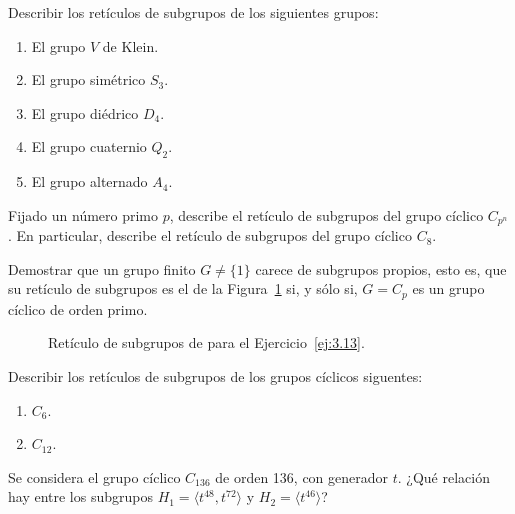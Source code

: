 \begin{ejercicio}\label{ej:3.11}
    Describir los retículos de subgrupos de los siguientes grupos:
    \begin{enumerate}
        \item El grupo $V$ de Klein.
        \item El grupo simétrico $S_3$.
        \item El grupo diédrico $D_4$.
        \item El grupo cuaternio $Q_2$.
        \item El grupo alternado $A_4$.
    \end{enumerate}
\end{ejercicio}

\begin{ejercicio}\label{ej:3.12}
    Fijado un número primo $p$, describe el retículo de subgrupos del grupo cíclico $C_{p^n}$. En particular, describe el retículo de subgrupos del grupo cíclico $C_8$.
\end{ejercicio}

\begin{ejercicio}\label{ej:3.13}
    Demostrar que un grupo finito $G \neq \{1\}$ carece de subgrupos propios, esto es, que su retículo de subgrupos es el de la Figura~\ref{fig:ej13} si, y sólo si, $G = C_p$ es un grupo cíclico de orden primo.
    \begin{figure}
        \centering
        \caption{Retículo de subgrupos de para el Ejercicio~\ref{ej:3.13}.}
        \label{fig:ej13}
    \end{figure}
\end{ejercicio}

\begin{ejercicio}\label{ej:3.14}
    Describir los retículos de subgrupos de los grupos cíclicos siguentes:
    \begin{enumerate}
        \item $C_6$.
        \item $C_{12}$.
    \end{enumerate}
\end{ejercicio}

\begin{ejercicio}\label{ej:3.15}
    Se considera el grupo cíclico $C_{136}$ de orden 136, con generador $t$. ¿Qué relación hay entre los subgrupos $H_1 = \langle t^{48}, t^{72} \rangle$ y $H_2 = \langle t^{46} \rangle$?
\end{ejercicio}

